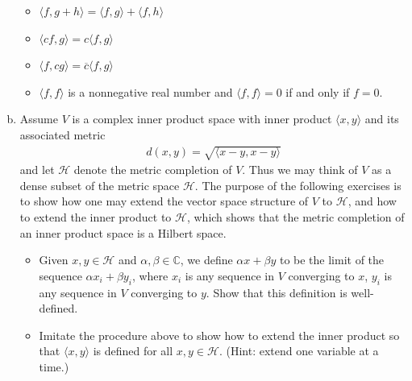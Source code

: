 \documentclass[11pt]{article}
\begin{document}
\begin{enumerate}[(a)]
\begin{itemize}
		
		\item $\boxed{\langle f, g+h \rangle  = \langle f,g \rangle + \langle f,h\rangle}$
		
		
		\item $\boxed{\langle cf,g\rangle = c\langle f,g\rangle}$
		
		\item $\boxed{\langle f,cg\rangle = \overline{c}\langle f,g\rangle}$
		
		
		\item $\langle f,f\rangle$ is a nonnegative real number and $\langle f,f \rangle = 0$ if and only if $f=0$.
		
		
		
	\end{itemize}  
	
	
	
	
	
	
	
	
	
	\item Assume $V$ is a complex inner product space with inner product $\langle x,y \rangle$ and its associated metric
	\begin{align*}
	d(x,y) = \sqrt{\langle x-y,x-y \rangle}
	\end{align*}
	and let $\mathcal{H}$ denote the metric completion of $V$. Thus we may think of $V$ as a dense subset of the metric space $\mathcal{H}$. The purpose of the following exercises is to show how one may extend the vector space structure of $V$ to $\mathcal{H}$, and how to extend the inner product to $\mathcal{H}$, which shows that the metric completion of an inner product space is a Hilbert space. 
	
	
	\begin{itemize}
		\item Given $x,y\in \mathcal{H}$ and $\alpha,\beta \in \mathbb{C}$, we define $\alpha x + \beta y$ to be the limit of the sequence $\alpha x_i + \beta y_i$, where $x_i$ is any sequence in $V$ converging to $x$, $y_i$ is any sequence in $V$ converging to $y$. Show that this definition is well-defined. 
		
		
		\item Imitate the procedure above to show how to extend the inner product so that $\langle x,y\rangle$ is defined for all $x,y\in \mathcal{H}$. (Hint: extend one variable at a time.)
	\end{itemize}
\end{enumerate}
\end{document}
